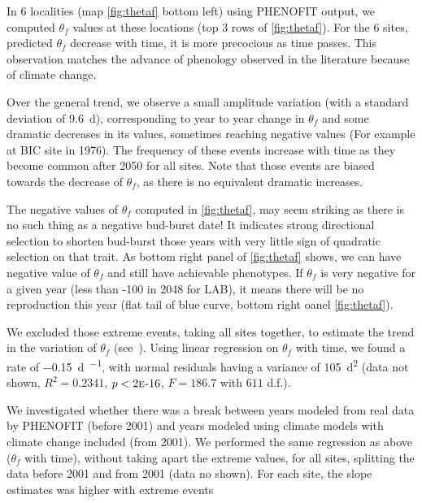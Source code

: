In 6 localities (map \autoref{fig:thetaf} bottom left) using \textsc{PHENOFIT} output, we computed $\theta_f$ values at these locations (top 3 rows of \autoref{fig:thetaf}). For the 6 sites, predicted $\theta_f$ decrease with time, it is more precocious as time passes. This observation matches the advance of phenology observed in the literature because of climate change.

Over the general trend, we observe a small amplitude variation (with a standard deviation of \SI{9.6}{\day}), corresponding to year to year change in $\theta_f$ and some dramatic decreases in its values, sometimes reaching negative values (For example at BIC site in 1976). The frequency of these events increase with time as they become common after 2050 for all sites. Note that those events are biased towards the decrease of $\theta_f$, as there is no equivalent dramatic increases.

The negative values of $\theta_f$ computed in \autoref{fig:thetaf}, may seem striking as there is no such thing as a negative bud-burst date! It indicates strong directional selection to shorten bud-burst those years with very little sign of quadratic selection on that trait. As bottom right panel of \autoref{fig:thetaf} shows, we can have negative value of $\theta_f$ and still have achievable phenotypes. If $\theta_f$ is very negative for a given year (less than -100 in 2048 for LAB), it means there will be no reproduction this year (flat tail of blue curve, bottom right oanel \autoref{fig:thetaf}).

We excluded those extreme events, taking all sites together, to estimate the trend in the variation of $\theta_f$ (see~). Using linear regression on $\theta_f$ with time, we found a rate of \SI{-0.15}{\day\per\year}, with normal residuals having a variance of \SI{105}{\day\squared} (data not shown, $R^2=0.2341$, $p<2\text{\sc{e}-}16$, $F=186.7$ with $611$ d.f.).

We investigated whether there was a break between years modeled from real data by \textsc{PHENOFIT} (before 2001) and years modeled using climate models with climate change included (from 2001). We performed the same regression as above ($\theta_f$ with time), without taking apart the extreme values, for all sites, splitting the data before 2001 and from 2001 (data no shown). For each site, the slope estimates was higher with extreme events
